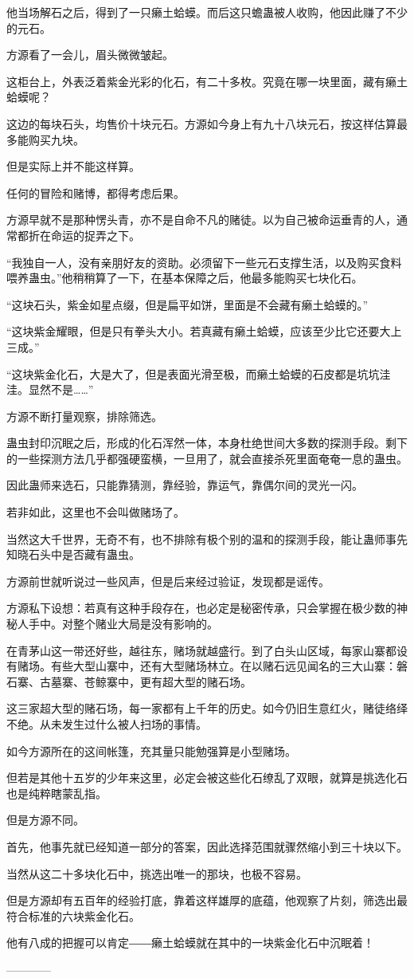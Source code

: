 \begin{this_body}
他当场解石之后，得到了一只癞土蛤蟆。而后这只蟾蛊被人收购，他因此赚了不少的元石。

方源看了一会儿，眉头微微皱起。

这柜台上，外表泛着紫金光彩的化石，有二十多枚。究竟在哪一块里面，藏有癞土蛤蟆呢？

这边的每块石头，均售价十块元石。方源如今身上有九十八块元石，按这样估算最多能购买九块。

但是实际上并不能这样算。

任何的冒险和赌博，都得考虑后果。

方源早就不是那种愣头青，亦不是自命不凡的赌徒。以为自己被命运垂青的人，通常都折在命运的捉弄之下。

“我独自一人，没有亲朋好友的资助。必须留下一些元石支撑生活，以及购买食料喂养蛊虫。”他稍稍算了一下，在基本保障之后，他最多能购买七块化石。

“这块石头，紫金如星点缀，但是扁平如饼，里面是不会藏有癞土蛤蟆的。”

“这块紫金耀眼，但是只有拳头大小。若真藏有癞土蛤蟆，应该至少比它还要大上三成。”

“这块紫金化石，大是大了，但是表面光滑至极，而癞土蛤蟆的石皮都是坑坑洼洼。显然不是……”

方源不断打量观察，排除筛选。

蛊虫封印沉眠之后，形成的化石浑然一体，本身杜绝世间大多数的探测手段。剩下的一些探测方法几乎都强硬蛮横，一旦用了，就会直接杀死里面奄奄一息的蛊虫。

因此蛊师来选石，只能靠猜测，靠经验，靠运气，靠偶尔间的灵光一闪。

若非如此，这里也不会叫做赌场了。

当然这大千世界，无奇不有，也不排除有极个别的温和的探测手段，能让蛊师事先知晓石头中是否藏有蛊虫。

方源前世就听说过一些风声，但是后来经过验证，发现都是谣传。

方源私下设想：若真有这种手段存在，也必定是秘密传承，只会掌握在极少数的神秘人手中。对整个赌业大局是没有影响的。

在青茅山这一带还好些，越往东，赌场就越盛行。到了白头山区域，每家山寨都设有赌场。有些大型山寨中，还有大型赌场林立。在以赌石远见闻名的三大山寨：磐石寨、古墓寨、苍鲸寨中，更有超大型的赌石场。

这三家超大型的赌石场，每一家都有上千年的历史。如今仍旧生意红火，赌徒络绎不绝。从未发生过什么被人扫场的事情。

如今方源所在的这间帐篷，充其量只能勉强算是小型赌场。

但若是其他十五岁的少年来这里，必定会被这些化石缭乱了双眼，就算是挑选化石也是纯粹瞎蒙乱指。

但是方源不同。

首先，他事先就已经知道一部分的答案，因此选择范围就骤然缩小到三十块以下。

当然从这二十多块化石中，挑选出唯一的那块，也极不容易。

但是方源却有五百年的经验打底，靠着这样雄厚的底蕴，他观察了片刻，筛选出最符合标准的六块紫金化石。

他有八成的把握可以肯定――癞土蛤蟆就在其中的一块紫金化石中沉眠着！

------------

\end{this_body}


